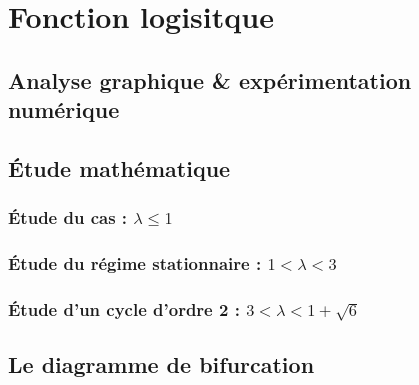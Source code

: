 \chapter{Fonction logisitque}

\section{Analyse graphique \& expérimentation numérique}

\section{\'Etude mathématique}
\subsection{\'Etude du cas : \texorpdfstring{$\lambda \leq 1$}{Lg}}
\subsection{\'Etude du régime stationnaire : \texorpdfstring{$1 < \lambda < 3$}{Lg}}
\subsection{\'Etude d'un cycle d'ordre 2 : \texorpdfstring{$3 < \lambda < 1+\sqrt{6}$}{Lg}}

\section{Le diagramme de bifurcation}